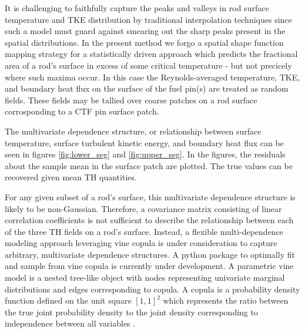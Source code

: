 \documentclass{anstrans}
\begin{document}
It is challenging to faithfully capture the peaks and valleys in
rod surface temperature and TKE distribution by traditional interpolation
techniques since such a model must guard against smearing out the sharp peaks
present in the spatial distributions.  
In the present method we forgo a spatial shape function mapping strategy
for a statistically driven approach which predicts the fractional
area of a rod's surface in excess of some critical temperature - but not
precicely where such maxima occur.
In this case the Reynolds-averaged temperature,
TKE, and boundary heat flux on the surface of the fuel pin(s) are treated
as random fields.  These fields may be tallied over coarse patches on a rod surface corrosponding
to a CTF pin surface patch.

The multivariate dependence structure, or relationship between surface temperature, surface
turbulent kinetic energy,
and boundary heat flux can be seen in figures \ref{fig:lower_seg} and
\ref{fig:upper_seg}.  In the figures, the residuals about the sample mean in
the surface patch are plotted.  The true values can be recovered given mean TH
quantities.

%

For any given subset of a rod's surface, this multivariate dependence structure is likely to
be non-Gaussian. Therefore, a covariance matrix consisting of linear correlation coefficients is not sufficient
to describe the relationship between each of the three TH fields on a rod's
surface.  Instead, a flexible multi-dependence modeling approach leveraging
vine copula is under consideration to capture arbitrary, multivariate
dependence structures.  A python package to optimally fit and sample from vine
copula is currently under development.  A parametric vine model is a nested
tree-like object with nodes representing univariate marginal distributions and
edges corresponding to copula.  A copula is a probability density function
defined on the unit square $[1, 1]^2$ which represents the ratio between the true
joint probability density to the joint density corresponding to independence between
all variables \cite{joe2015}.
\end{document}
